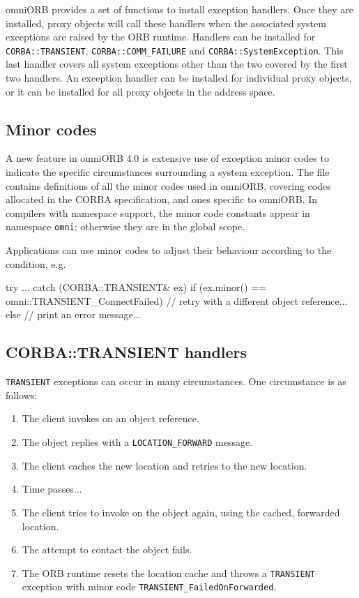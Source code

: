 \documentclass[11pt,twoside,a4paper]{book}
\newcommand{\code}[1]{\texttt{#1}}
\newcommand{\file}{\begingroup \urlstyle{tt}\Url}
\newcommand{\dsc}{\discretionary{}{}{}}
\begin{document}
omniORB provides a set of functions to install exception handlers.
Once they are installed, proxy objects will call these handlers when
the associated system exceptions are raised by the ORB runtime.
Handlers can be installed for \code{CORBA::\dsc{}TRANSIENT},
\code{CORBA::COMM\_FAILURE} and \code{CORBA::SystemException}.  This
last handler covers all system exceptions other than the two covered
by the first two handlers. An exception handler can be installed for
individual proxy objects, or it can be installed for all proxy objects
in the address space.


\subsection{Minor codes}

A new feature in omniORB 4.0 is extensive use of exception minor codes
to indicate the specific circumstances surrounding a system exception.
The file \file{include/omniORB4/minorCode.h} contains definitions of
all the minor codes used in omniORB, covering codes allocated in the
CORBA specification, and ones specific to omniORB. In compilers with
namespace support, the minor code constants appear in namespace
\code{omni}; otherwise they are in the global scope.

Applications can use minor codes to adjust their behaviour according
to the condition, e.g.

\begin{cxxlisting}
try {
  ...
}
catch (CORBA::TRANSIENT& ex) {
  if (ex.minor() == omni::TRANSIENT_ConnectFailed) {
    // retry with a different object reference...
  }
  else {
    // print an error message...
  }
}
\end{cxxlisting}



\subsection{CORBA::TRANSIENT handlers}

\code{TRANSIENT} exceptions can occur in many circumstances. One
circumstance is as follows:

\begin{enumerate}

\item The client invokes on an object reference.
\item The object replies with a \code{LOCATION\_FORWARD} message.
\item The client caches the new location and retries to the new location.
\item Time passes...
\item The client tries to invoke on the object again, using the
      cached, forwarded location. 
\item The attempt to contact the object fails.
\item The ORB runtime resets the location cache and throws a
      \code{TRANSIENT} exception with minor code
      \code{TRANSIENT\_FailedOnForwarded}.

\end{enumerate}
\end{document}
